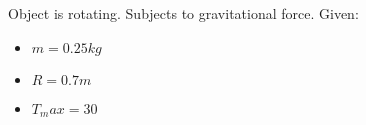 

Object is rotating. Subjects to gravitational force.
Given: 

\begin{itemize}
    \item $  m  = 0.25kg $
    \item $ R = 0.7m $
    \item $ T_max = 30 $
\end{itemize}
